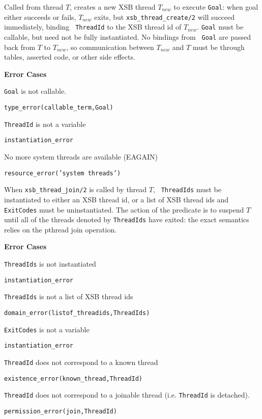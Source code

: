 \begin{description}

%
Called from thread $T$, creates a new XSB thread $T_{new}$ to execute
{\tt Goal}: when goal either succeeds or fails, $T_{new}$ exits, but
{\tt xsb\_thread\_create/2} will succeed immediately, binding {\tt
  ThreadId} to the XSB thread id of $T_{new}$.  {\tt Goal} must be
callable, but need not be fully instantiated.  No bindings from {\tt
  Goal} are passed back from $T$ to $T_{new}$, so communication
between $T_{new}$ and $T$ must be through tables, asserted code, or
other side effects.

{\bf Error Cases}
\bi
\item 	{\tt Goal} is not callable.
\bi
\item 	{\tt type\_error(callable\_term,Goal)}
\ei
%
\item 	{\tt ThreadId} is not a variable
\bi
\item 	{\tt instantiation\_error}
\ei
\item   No more system threads are available (EAGAIN)
\bi
\item {\tt resource\_error('system threads')}
\ei
\ei

% 
When {\tt xsb\_thread\_join/2} is called by thread $T$, {\tt
  ThreadIds} must be instantiated to either an XSB thread id, or a
list of XSB thread ids and {\tt ExitCodes} must be uninstantiated.
The action of the predicate is to suspend $T$ until all of the threads
denoted by {\tt ThreadIds} have exited: the exact semantics relies on
the {\sc pthread} join operation.

{\bf Error Cases}
\bi
\item 	{\tt ThreadIds} is not instantiated
\bi
\item 	{\tt instantiation\_error}
\ei
%
\item 	{\tt ThreadIds} is not a list of XSB thread ids
\bi
\item 	{\tt domain\_error(listof\_threadids,ThreadIds)}
\ei
%
\item 	{\tt ExitCodes} is not a variable
\bi
\item 	{\tt instantiation\_error}
\ei
%
\item   {\tt ThreadId} does not correspond to a known thread
\bi
\item   {\tt existence\_error(known\_thread,ThreadId)}
\ei
\item   {\tt ThreadId} does not correspond to a joinable thread
  (i.e. {\tt ThreadId} is detached).
\bi
\item   {\tt permission\_error(join,ThreadId)}
\ei
\ei


\end{description}
